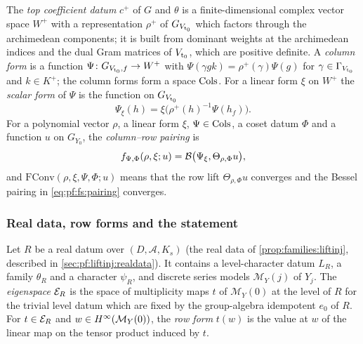 \begin{definition}\label{pf:fs:cols}
The \emph{top coefficient datum} $c^+$ of $G$ and $\theta$ is a finite-dimensional complex vector space $W^+$ with a
representation $\rho^+$ of $G_{V_{\mathrm{t}_0}}$ which factors through the archimedean components; it is built from dominant
weights at the archimedean indices and the dual Gram matrices of $V_{\mathrm{t}_0}$, which are positive definite. A
\emph{column form} is a function $\Psi\colon G_{V_{\mathrm{t}_0},f}\to W^+$ with $\Psi(\gamma gk)=\rho^+(\gamma)\Psi(g)$ for
$\gamma\in\Gamma_{V_{\mathrm{t}_0}}$ and $k\in K^+$; the column forms form a space $\mathrm{Cols}$. For a linear form $\xi$ on $W^+$ the
\emph{scalar form} of $\Psi$ is the function on $G_{V_{\mathrm{t}_0}}$
\[
\Psi_\xi(h)=\xi\bigl(\rho^+(h)^{-1}\Psi(h_f)\bigr).
\]
For a polynomial vector $\rho$, a linear form $\xi$, $\Psi\in\mathrm{Cols}$, a coset datum $\Phi$ and a function $u$ on $G_{Y_0}$, the
\emph{column--row pairing} is
\begin{equation}\label{eq:pf:fs:pairing}
f_{\Psi,\Phi}(\rho,\xi;u)=\mathcal B\bigl(\Psi_\xi,\Theta_{\rho,\Phi}u\bigr),
\end{equation}
and $\mathrm{FConv}(\rho,\xi,\Psi,\Phi;u)$ means that the row lift $\Theta_{\rho,\Phi}u$ converges and the Bessel pairing in
\eqref{eq:pf:fs:pairing} converges.
\end{definition}

\subsubsection{Real data, row forms and the statement}

\begin{definition}\label{pf:fs:rowform}
Let $R$ be a real datum over $(D,\mathcal A,K_s)$ (the real data of \cref{prop:families:liftinj}, described in
\cref{sec:pf:liftinj:realdata}). It contains a level-character datum $L_R$, a family
$\theta_R$ and a character $\psi_R$, and discrete series models $\mathcal M_Y(j)$ of $Y_j$. The \emph{eigenspace} $\mathcal E_R$ is the
space of multiplicity maps $t$ of $\mathcal M_Y(0)$ at the level of $R$ for the trivial level datum which are fixed by the
group-algebra idempotent $e_0$ of $R$. For $t\in\mathcal E_R$ and $w\in H^{\infty}(\mathcal M_Y(0))$, the \emph{row form} $t(w)$ is the value
at $w$ of the linear map on the tensor product induced by $t$.
\end{definition}

